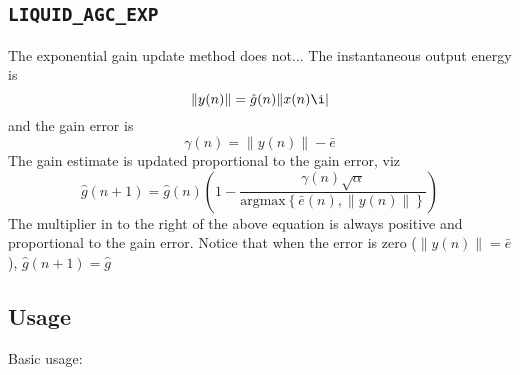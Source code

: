 \subsection{{\tt LIQUID\_AGC\_EXP}}
The exponential gain update method does not...
The instantaneous output energy is
\[  \|y(n)\| = \hat{g}(n)\|x(n)\i|      \]
and the gain error is
\[
    \gamma(n) = \|y(n)\| - \bar{e}
\]
The gain estimate is updated proportional to the gain error, viz
\[
    \hat{g}(n+1) =
        \hat{g}(n) \left(1 -
         \frac{
            \gamma(n)\sqrt{\alpha}
        }{
            \text{argmax}\left\{\bar{e}(n),\|y(n)\|\right\}
        }
    \right)
\]
The multiplier in to the right of the above equation is always positive
and proportional to the gain error.
Notice that when the error is zero ($\|y(n)\| = \bar{e}$),
$\hat{g}(n+1) = \hat{g}$

\subsection{Usage}
Basic usage:

